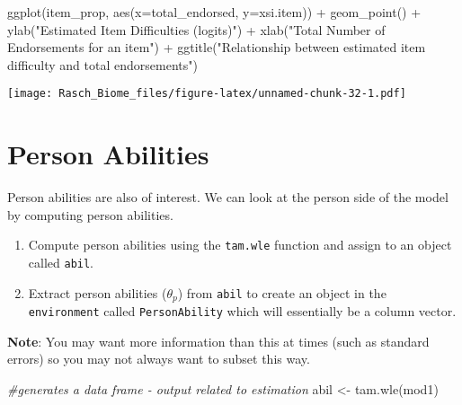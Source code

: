\documentclass[
]{book}
\newenvironment{Shaded}{\begin{snugshade}}{\end{snugshade}}
\newcommand{\AttributeTok}[1]{\textcolor[rgb]{0.77,0.63,0.00}{#1}}
\newcommand{\CommentTok}[1]{\textcolor[rgb]{0.56,0.35,0.01}{\textit{#1}}}
\newcommand{\FunctionTok}[1]{\textcolor[rgb]{0.00,0.00,0.00}{#1}}
\newcommand{\NormalTok}[1]{#1}
\newcommand{\OtherTok}[1]{\textcolor[rgb]{0.56,0.35,0.01}{#1}}
\newcommand{\SpecialCharTok}[1]{\textcolor[rgb]{0.00,0.00,0.00}{#1}}
\newcommand{\StringTok}[1]{\textcolor[rgb]{0.31,0.60,0.02}{#1}}
\begin{document}
\begin{Shaded}
\begin{Highlighting}[]
\FunctionTok{ggplot}\NormalTok{(item\_prop, }\FunctionTok{aes}\NormalTok{(}\AttributeTok{x=}\NormalTok{total\_endorsed, }\AttributeTok{y=}\NormalTok{xsi.item)) }\SpecialCharTok{+} 
  \FunctionTok{geom\_point}\NormalTok{() }\SpecialCharTok{+}
  \FunctionTok{ylab}\NormalTok{(}\StringTok{"Estimated Item Difficulties (logits)"}\NormalTok{) }\SpecialCharTok{+}
  \FunctionTok{xlab}\NormalTok{(}\StringTok{"Total Number of Endorsements for an item"}\NormalTok{) }\SpecialCharTok{+}
  \FunctionTok{ggtitle}\NormalTok{(}\StringTok{"Relationship between estimated item difficulty and total endorsements"}\NormalTok{)}
\end{Highlighting}
\end{Shaded}

\texttt{[image: Rasch\_Biome\_files/figure-latex/unnamed-chunk-32-1.pdf]}

\hypertarget{person-abilities}{%
\chapter{Person Abilities}\label{person-abilities}}

Person abilities are also of interest. We can look at the person side of the model by computing person abilities.

\begin{enumerate}
\def\labelenumi{\arabic{enumi}.}
\item
  Compute person abilities using the \texttt{tam.wle} function and assign to an object called \texttt{abil}.
\item
  Extract person abilities (\(\theta_p\)) from \texttt{abil} to create an object in the \texttt{environment} called \texttt{PersonAbility} which will essentially be a column vector.
\end{enumerate}

\textbf{Note}: You may want more information than this at times (such as standard errors) so you may not always want to subset this way.

\begin{Shaded}
\begin{Highlighting}[]
\CommentTok{\#generates a data frame {-} output related to estimation}
\NormalTok{abil }\OtherTok{\textless{}{-}} \FunctionTok{tam.wle}\NormalTok{(mod1)}
\end{Highlighting}
\end{Shaded}
\end{document}
